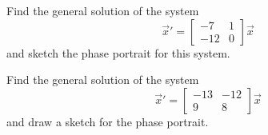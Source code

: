 \begin{exercise}\ansMark%
Find the general solution of the system
\begin{equation*}
{\vec{x}}' = \begin{bmatrix} -7 & 1 \\ -12 & 0 \end{bmatrix} \vec{x}
\end{equation*}
and sketch the phase portrait for this system.
\end{exercise}
%

\begin{exercise}\ansMark%
Find the general solution of the system
\begin{equation*}
{\vec{x}}' = \begin{bmatrix} -13 & -12 \\ 9 & 8 \end{bmatrix} \vec{x}
\end{equation*}
and draw a sketch for the phase portrait.
\end{exercise}
%



